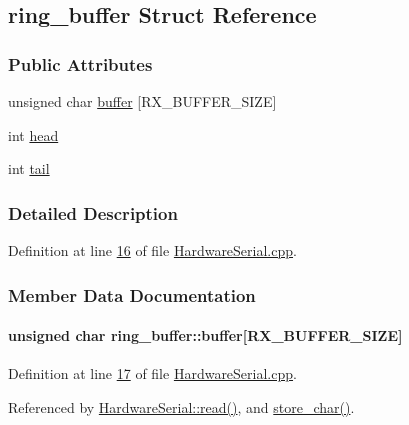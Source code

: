 \hypertarget{structring__buffer}{
\subsection{ring\_\-buffer Struct Reference}
\label{structring__buffer}
}
\subsubsection*{Public Attributes}
\begin{DoxyCompactItemize}
\item 
unsigned char \hyperlink{structring__buffer_a11b70d4a150ea9750e4102706d6ee0b8}{buffer} \mbox{[}RX\_\-BUFFER\_\-SIZE\mbox{]}
\item 
int \hyperlink{structring__buffer_ac1b620f2e27c3af75e68bd1645a2f5f0}{head}
\item 
int \hyperlink{structring__buffer_a4d06965736f37f64f15bbd0ca9457771}{tail}
\end{DoxyCompactItemize}


\subsubsection{Detailed Description}


Definition at line \hyperlink{_hardware_serial_8cpp_source_l00016}{16} of file \hyperlink{_hardware_serial_8cpp_source}{HardwareSerial.cpp}.



\subsubsection{Member Data Documentation}
\hypertarget{structring__buffer_a11b70d4a150ea9750e4102706d6ee0b8}{
\paragraph[{buffer}]{\setlength{\rightskip}{0pt plus 5cm}unsigned char {\bf ring\_\-buffer::buffer}\mbox{[}RX\_\-BUFFER\_\-SIZE\mbox{]}}\hfill}
\label{structring__buffer_a11b70d4a150ea9750e4102706d6ee0b8}


Definition at line \hyperlink{_hardware_serial_8cpp_source_l00017}{17} of file \hyperlink{_hardware_serial_8cpp_source}{HardwareSerial.cpp}.



Referenced by \hyperlink{_hardware_serial_8cpp_source_l00218}{HardwareSerial::read()}, and \hyperlink{_hardware_serial_8cpp_source_l00047}{store\_\-char()}.

